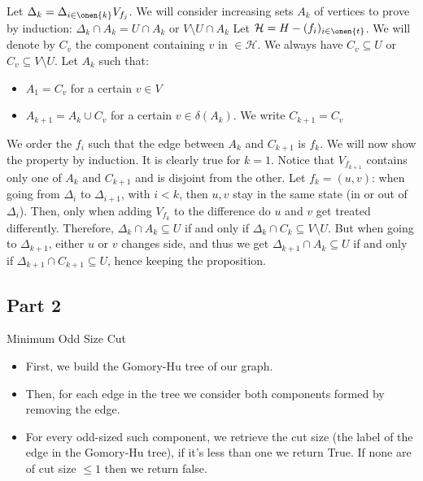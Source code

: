 \documentclass[math, info]{cours}
\begin{document}
Let $\Delta_{k} = \Delta_{i \in \onen{k}} V_{f_{j}}$. We will consider increasing sets $A_{k}$  of vertices to prove by induction: $\Delta_{k} \cap A_{k} = U \cap A_{k} \text{ or } V\setminus U \cap A_{k}$ 
Let $\mathcal{H} = H - (f_{i})_{i \in \onen{t}}$. 
We will denote by $C_v$ the component containing $v$ in $\in \mathcal{H}$. We always have $C_{v} \subseteq U$ or $C_v \subseteq V \setminus U$. 
Let $A_{k}$ such that: 
\begin{itemize}
  \item $A_{1} = C_{v}$ for a certain $v \in V$
  \item $A_{k + 1} = A_{k} \cup C_v$ for a certain $v \in \delta(A_{k})$. We write $C_{k + 1} = C_{v}$
\end{itemize}
We order the $f_{i}$ such that the edge between $A_{k}$ and $C_{k + 1}$ is $f_{k}$.
We will now show the property by induction. It is clearly true for $k = 1$. 
Notice that $V_{f_{k + 1}}$ contains only one of $A_{k}$ and $C_{k + 1}$ and is disjoint from the other.
Let $f_{k} = (u, v)$: when going from $\Delta_{i}$ to $\Delta_{i + 1}$, with $i < k$, then $u, v$ stay in the same state (in or out of $\Delta_i$).  
Then, only when adding $V_{f_{k}}$ to the difference do $u$ and $v$ get treated differently.
Therefore, $\Delta_{k} \cap A_{k} \subseteq U$ if and only if $\Delta_{k} \cap C_{k} \subseteq V \setminus U$. 
But when going to $\Delta_{k + 1}$, either $u$ or $v$ changes side, and thus we get $\Delta_{k + 1} \cap A_{k} \subseteq U$ if and only if $\Delta_{k + 1} \cap C_{k + 1} \subseteq U$, hence keeping the proposition. 

\subsection{Part 2}
\begin{algorithm}
	\caption{Minimum Odd Size Cut}
	\begin{itemize}
		\item First, we build the Gomory-Hu tree of our graph.
		\item Then, for each edge in the tree we consider both components formed by removing the edge.
		\item For every odd-sized such component, we retrieve the cut size (the label of the edge in the Gomory-Hu tree), if it's less than one we return True.
			If none are of cut size $\leq 1$ then we return false.
	\end{itemize}
\end{algorithm}
\end{document}
